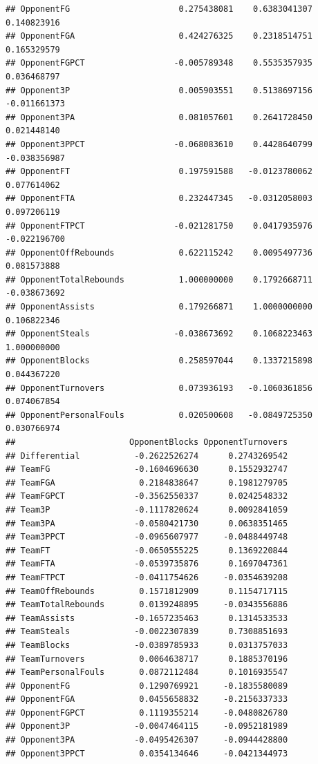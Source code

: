 \documentclass[]{book}
\begin{document}
\begin{verbatim}
## OpponentFG                      0.275438081    0.6383041307    0.140823916
## OpponentFGA                     0.424276325    0.2318514751    0.165329579
## OpponentFGPCT                  -0.005789348    0.5535357935    0.036468797
## Opponent3P                      0.005903551    0.5138697156   -0.011661373
## Opponent3PA                     0.081057601    0.2641728450    0.021448140
## Opponent3PPCT                  -0.068083610    0.4428640799   -0.038356987
## OpponentFT                      0.197591588   -0.0123780062    0.077614062
## OpponentFTA                     0.232447345   -0.0312058003    0.097206119
## OpponentFTPCT                  -0.021281750    0.0417935976   -0.022196700
## OpponentOffRebounds             0.622115242    0.0095497736    0.081573888
## OpponentTotalRebounds           1.000000000    0.1792668711   -0.038673692
## OpponentAssists                 0.179266871    1.0000000000    0.106822346
## OpponentSteals                 -0.038673692    0.1068223463    1.000000000
## OpponentBlocks                  0.258597044    0.1337215898    0.044367220
## OpponentTurnovers               0.073936193   -0.1060361856    0.074067854
## OpponentPersonalFouls           0.020500608   -0.0849725350    0.030766974
##                       OpponentBlocks OpponentTurnovers
## Differential           -0.2622526274      0.2743269542
## TeamFG                 -0.1604696630      0.1552932747
## TeamFGA                 0.2184838647      0.1981279705
## TeamFGPCT              -0.3562550337      0.0242548332
## Team3P                 -0.1117820624      0.0092841059
## Team3PA                -0.0580421730      0.0638351465
## Team3PPCT              -0.0965607977     -0.0488449748
## TeamFT                 -0.0650555225      0.1369220844
## TeamFTA                -0.0539735876      0.1697047361
## TeamFTPCT              -0.0411754626     -0.0354639208
## TeamOffRebounds         0.1571812909      0.1154717115
## TeamTotalRebounds       0.0139248895     -0.0343556886
## TeamAssists            -0.1657235463      0.1314533533
## TeamSteals             -0.0022307839      0.7308851693
## TeamBlocks             -0.0389785933      0.0313757033
## TeamTurnovers           0.0064638717      0.1885370196
## TeamPersonalFouls       0.0872112484      0.1016935547
## OpponentFG              0.1290769921     -0.1835580089
## OpponentFGA             0.0455658832     -0.2156337333
## OpponentFGPCT           0.1119355214     -0.0480826780
## Opponent3P             -0.0047464115     -0.0952181989
## Opponent3PA            -0.0495426307     -0.0944428800
## Opponent3PPCT           0.0354134646     -0.0421344973

\end{verbatim}
\end{document}

